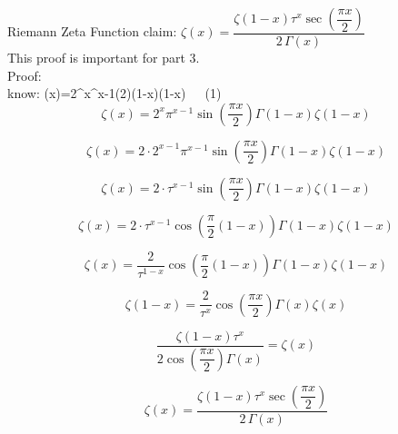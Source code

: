 \documentclass[12pt]{article}
\begin{document}
\pagebreak\begin{section}{Riemann Zeta Function}
	claim: $\zeta(x)=\dfrac{\zeta(1-x)\tau^x\sec\left(\dfrac{\pi x}2\right)}{2\,\Gamma(x)}$\\
	This proof is important for part 3.\\
	Proof:\\
	know: \zeta(x)=2^x\pi^{x-1}\sin\left(2\right)\Gamma(1-x)\zeta(1-x)~~~(1)\\

	\begin{equation}
		\zeta(x)=2^x\pi^{x-1}\sin\left(\dfrac{\pi x}2\right)\Gamma\left(1-x\right)\zeta\left(1-x\right)
	\end{equation}

	\begin{equation}
		\zeta(x)=2\cdot2^{x-1}\pi^{x-1}\sin\left(\dfrac{\pi x}2\right)\Gamma(1-x)\zeta(1-x)
	\end{equation}

	\begin{equation}
		\zeta(x)=2\cdot\tau^{x-1}\sin\left(\dfrac{\pi x}2\right)\Gamma(1-x)\zeta(1-x)
	\end{equation}

	\begin{equation}
		\zeta(x)=2\cdot\tau^{x-1}\cos\left(\dfrac\pi2(1-x)\right)\Gamma(1-x)\zeta(1-x)
	\end{equation}

	\begin{equation}
		\zeta(x)=\dfrac2{\tau^{1-x}}\cos\left(\dfrac\pi2(1-x)\right)\Gamma(1-x)\zeta(1-x)
	\end{equation}

	\begin{equation}
		\zeta(1-x)=\dfrac2{\tau^x}\cos\left(\dfrac{\pi x}2\right)\Gamma(x)\zeta(x)
	\end{equation}

	\begin{equation}
		\dfrac{\zeta(1-x)\tau^x}{2\cos\left(\dfrac{\pi x}2\right)\Gamma(x)}=\zeta(x)
	\end{equation}

	\begin{equation}
		\zeta(x)=\dfrac{\zeta(1-x)\tau^x\sec\left(\dfrac{\pi x}2\right)}{2\,\Gamma(x)}
	\end{equation}

	\noindent\blacksquare
\end{section}
\end{document}
